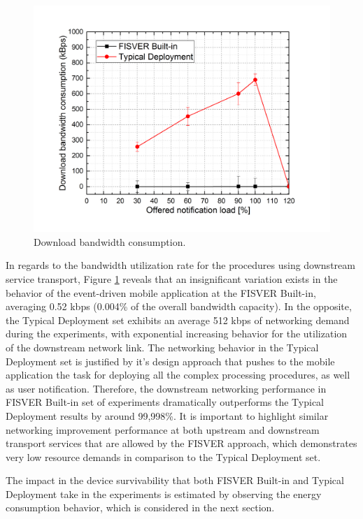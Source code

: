 \begin{figure}[htb]
	\centering
 	\includegraphics[scale=0.60]{Imagens/cap5_download.png}
 	\caption{Download bandwidth consumption.}
 	\label{fig:result4}
\end{figure}

In regards to the bandwidth utilization rate for the procedures using downstream service transport, Figure \ref{fig:result4} reveals that an insignificant variation exists in the behavior of the event-driven mobile application at the FISVER Built-in, averaging 0.52 kbps (0.004\% of the overall bandwidth capacity). In the opposite, the Typical Deployment set exhibits an average 512 kbps of networking demand during the experiments, with exponential increasing behavior for the utilization of the downstream network link. The networking behavior in the Typical Deployment set is justified by it's design approach that pushes to the mobile application the task for deploying all the complex processing procedures, as well as user notification. Therefore, the downstream networking performance in FISVER Built-in set of experiments dramatically outperforms the Typical Deployment results by around 99,998\%. It is important to highlight similar networking improvement performance at both upstream and downstream transport services that are allowed by the FISVER approach, which demonstrates very low resource demands in comparison to the Typical Deployment set.

The impact in the device survivability that both FISVER Built-in and Typical Deployment take in the experiments is estimated by observing the  energy consumption behavior, which is considered in the next section. 

